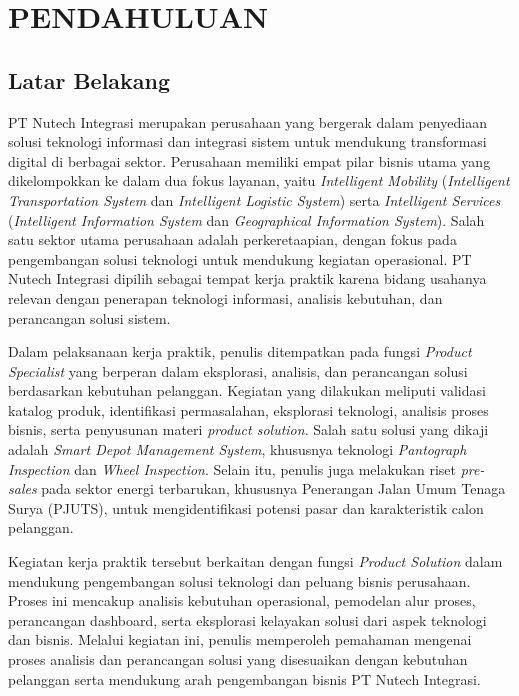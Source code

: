 \cleardoublepage %
\chapter{PENDAHULUAN}
\label{chap:pendahuluan}
\section{Latar Belakang}
\label{sec:latar_belakang}
PT Nutech Integrasi merupakan perusahaan yang bergerak dalam penyediaan solusi teknologi informasi dan integrasi sistem untuk mendukung transformasi digital di berbagai sektor. Perusahaan memiliki empat pilar bisnis utama yang dikelompokkan ke dalam dua fokus layanan, yaitu \textit{Intelligent Mobility} (\textit{Intelligent Transportation System} dan \textit{Intelligent Logistic System}) serta \textit{Intelligent Services} (\textit{Intelligent Information System} dan \textit{Geographical Information System}). Salah satu sektor utama perusahaan adalah perkeretaapian, dengan fokus pada pengembangan solusi teknologi untuk mendukung kegiatan operasional. PT Nutech Integrasi dipilih sebagai tempat kerja praktik karena bidang usahanya relevan dengan penerapan teknologi informasi, analisis kebutuhan, dan perancangan solusi sistem.

Dalam pelaksanaan kerja praktik, penulis ditempatkan pada fungsi \textit{Product Specialist} yang berperan dalam eksplorasi, analisis, dan perancangan solusi berdasarkan kebutuhan pelanggan. Kegiatan yang dilakukan meliputi validasi katalog produk, identifikasi permasalahan, eksplorasi teknologi, analisis proses bisnis, serta penyusunan materi \textit{product solution}. Salah satu solusi yang dikaji adalah \textit{Smart Depot Management System}, khususnya teknologi \textit{Pantograph Inspection} dan \textit{Wheel Inspection}. Selain itu, penulis juga melakukan riset \textit{pre-sales} pada sektor energi terbarukan, khususnya Penerangan Jalan Umum Tenaga Surya (PJUTS), untuk mengidentifikasi potensi pasar dan karakteristik calon pelanggan.

Kegiatan kerja praktik tersebut berkaitan dengan fungsi \textit{Product Solution} dalam mendukung pengembangan solusi teknologi dan peluang bisnis perusahaan. Proses ini mencakup analisis kebutuhan operasional, pemodelan alur proses, perancangan dashboard, serta eksplorasi kelayakan solusi dari aspek teknologi dan bisnis. Melalui kegiatan ini, penulis memperoleh pemahaman mengenai proses analisis dan perancangan solusi yang disesuaikan dengan kebutuhan pelanggan serta mendukung arah pengembangan bisnis PT Nutech Integrasi.

